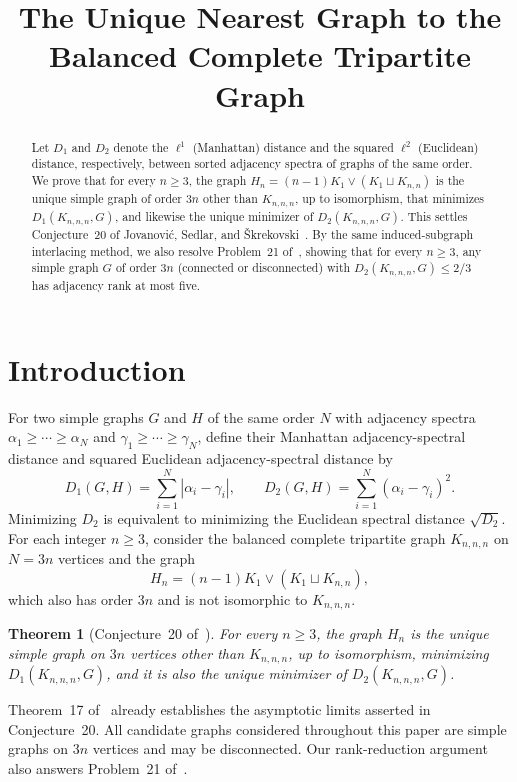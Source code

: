 \documentclass[10pt]{article}
\title{The Unique Nearest Graph to the Balanced Complete Tripartite Graph}
\author{}
\date{}
\newtheorem{theorem}{Theorem}
\begin{document}
\maketitle

\begin{abstract}
Let $D_1$ and $D_2$ denote the $\ell^1$ (Manhattan) distance and the squared $\ell^2$ (Euclidean) distance, respectively, between sorted adjacency spectra of graphs of the same order. We prove that for every $n \geq 3$, the graph $H_n = (n-1)K_1 \vee (K_1 \sqcup K_{n,n})$ is the unique simple graph of order $3n$ other than $K_{n,n,n}$, up to isomorphism, that minimizes $D_1(K_{n,n,n}, G)$, and likewise the unique minimizer of $D_2(K_{n,n,n}, G)$. This settles Conjecture~20 of Jovanovi\'{c}, Sedlar, and \v{S}krekovski~\cite{JSS2026}. By the same induced-subgraph interlacing method, we also resolve Problem~21 of~\cite{JSS2026}, showing that for every $n \geq 3$, any simple graph $G$ of order $3n$ (connected or disconnected) with $D_2(K_{n,n,n}, G) \leq 2/3$ has adjacency rank at most five.
\end{abstract}

\section{Introduction}

For two simple graphs $G$ and $H$ of the same order $N$ with adjacency spectra $\alpha_1 \geq \cdots \geq \alpha_N$ and $\gamma_1 \geq \cdots \geq \gamma_N$, define their Manhattan adjacency-spectral distance and squared Euclidean adjacency-spectral distance by
\[
D_1(G,H) = \sum_{i=1}^N |\alpha_i - \gamma_i|, \qquad
D_2(G,H) = \sum_{i=1}^N (\alpha_i - \gamma_i)^2.
\]
Minimizing $D_2$ is equivalent to minimizing the Euclidean spectral distance $\sqrt{D_2}$. For each integer $n \geq 3$, consider the balanced complete tripartite graph $K_{n,n,n}$ on $N = 3n$ vertices and the graph
\[
H_n = (n-1)K_1 \vee (K_1 \sqcup K_{n,n}),
\]
which also has order $3n$ and is not isomorphic to $K_{n,n,n}$.

\begin{theorem}[Conjecture~20 of~\cite{JSS2026}]\label{thm:conj20}
For every $n \geq 3$, the graph $H_n$ is the unique simple graph on $3n$ vertices other than $K_{n,n,n}$, up to isomorphism, minimizing $D_1(K_{n,n,n}, G)$, and it is also the unique minimizer of $D_2(K_{n,n,n}, G)$.
\end{theorem}

Theorem~17 of~\cite{JSS2026} already establishes the asymptotic limits asserted in Conjecture~20. All candidate graphs considered throughout this paper are simple graphs on $3n$ vertices and may be disconnected. Our rank-reduction argument also answers Problem~21 of~\cite{JSS2026}.
\end{document}
